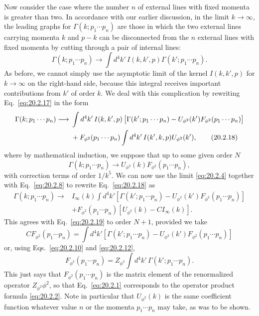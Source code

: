 Now consider the case where the number $n$ of external lines with fixed
momenta is greater than two. In accordance with our earlier discussion, in
the limit $k\to\infty$, the leading graphs for
$\Gamma(k;p_1\cdots p_n)$ are those in which the two external lines carrying
momenta $k$ and $p-k$ can be disconnected from the $n$ external lines with
fixed momenta by cutting through a pair of internal lines:
\begin{equation}
 \Gamma(k;p_1\cdots p_n)\longrightarrow
 \int d^4k'\,I(k,k',p)\Gamma(k';p_1\cdots p_n).
 \tag{20.2.17}\label{eq:20.2.17}
\end{equation}
As before, we cannot simply use the asymptotic limit of the kernel
$I(k,k',p)$ for $k\to\infty$ on the right-hand side, because this integral
receives important contributions from $k'$ of order $k$. We deal with this
complication by rewriting Eq.~\eqref{eq:20.2.17} in the form
\begin{align}
 \Gamma(k;p_1\cdots p_n)\longrightarrow{}&
 \int d^4k'\,I(k,k',p)
 \left[\Gamma(k';p_1\cdots p_n)
 -U_{\phi^2}(k')F_{\phi^2}(p_1\cdots p_n)\right]
 \notag\\
 &+F_{\phi^2}(p_1\cdots p_n)
 \int d^4k'\,I(k',k,p)U_{\phi^2}(k'),
 \tag{20.2.18}\label{eq:20.2.18}
\end{align}
where by mathematical induction, we suppose that up to some given order $N$
\begin{equation}
 \Gamma(k;p_1\cdots p_n)\longrightarrow
 U_{\phi^2}(k)F_{\phi^2}(p_1\cdots p_n),
 \tag{20.2.19}\label{eq:20.2.19}
\end{equation}
with correction terms of order $1/k^5$. We can now use the limit
\eqref{eq:20.2.4} together with Eq.~\eqref{eq:20.2.8} to rewrite
Eq.~\eqref{eq:20.2.18} as
\begin{align*}
 \Gamma(k;p_1\cdots p_n)\longrightarrow{}&
 I_\infty(k)\int d^4k'
 \left[\Gamma(k';p_1\cdots p_n)
 -U_{\phi^2}(k')F_{\phi^2}(p_1\cdots p_n)\right]
 \\
 &+F_{\phi^2}(p_1\cdots p_n)
 \left[U_{\phi^2}(k)-CI_\infty(k)\right].
\end{align*}
This agrees with Eq.~\eqref{eq:20.2.19} to order $N+1$, provided we take
\[
 CF_{\phi^2}(p_1\cdots p_n)=\int d^4k'
 \left[\Gamma(k';p_1\cdots p_n)
 -U_{\phi^2}(k')F_{\phi^2}(p_1\cdots p_n)\right]
\]
or, using Eqs.~\eqref{eq:20.2.10} and \eqref{eq:20.2.12},
\begin{equation}
 F_{\phi^2}(p_1\cdots p_n)=
 Z_{\phi^2}\int d^4k'\,\Gamma(k';p_1\cdots p_n).
 \tag{20.2.20}\label{eq:20.2.20}
\end{equation}
This just says that $F_{\phi^2}(p_1\cdots p_n)$ is the matrix element of the
renormalized operator $Z_{\phi^2}\phi^2$, so that Eq.~\eqref{eq:20.2.1}
corresponds to the operator product formula \eqref{eq:20.2.2}. Note in
particular that $U_{\phi^2}(k)$ is the same coefficient function whatever
value $n$ or the momenta $p_1\cdots p_n$ may take, as was to be shown.

